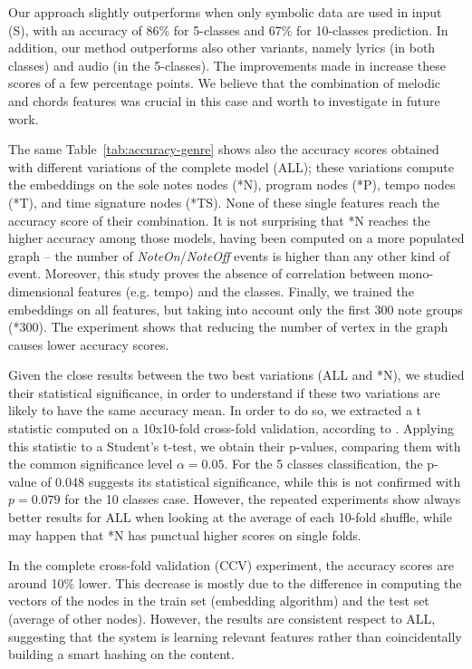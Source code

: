 \documentclass{article}
\newcommand{\tabref}[1]{\mbox{Table~\ref{#1}}}
\begin{document}
Our approach slightly outperforms \citep{mckay2010datasetslac} when only symbolic data are used in input (S), with an accuracy of 86\% for 5-classes and 67\% for 10-classes prediction. In addition, our method outperforms also other variants, namely lyrics (in both classes) and audio (in the 5-classes). The improvements made in \citep{mckay2018} increase these scores of a few percentage points. We believe that the combination of melodic and chords features was crucial in this case and worth to investigate in future work.

The same \tabref{tab:accuracy-genre} shows also the accuracy scores obtained with different variations of the complete model (ALL); these variations compute the embeddings on the sole notes nodes (*N), program nodes (*P), tempo nodes (*T), and time signature nodes (*TS). None of these single features reach the accuracy score of their combination. It is not surprising that *N reaches the higher accuracy among those models, having been computed on a more populated graph -- the number of  \textit{NoteOn}/\textit{NoteOff} events is higher than any other kind of event. Moreover, this study proves the absence of correlation between mono-dimensional features (e.g. tempo) and the classes.
Finally, we trained the embeddings on all features, but taking into account only the first 300 note groups (*300). The experiment shows that reducing the number of vertex in the graph causes lower accuracy scores.

Given the close results between the two best variations (ALL and *N), we studied their statistical significance, in order to understand if these two variations are likely to have the same accuracy mean. In order to do so, we extracted a t statistic computed on a 10x10-fold cross-fold validation, according to \cite{bouckaert2004significance}. Applying this statistic to a Student's t-test, we obtain their p-values, comparing them with the common significance level $\alpha = 0.05$. For the 5 classes classification, the p-value of 0.048 suggests its statistical significance, while this is not confirmed with $p = 0.079$ for the 10 classes case. However, the repeated experiments show always better results for ALL when looking at the average of each 10-fold shuffle, while may happen that *N has punctual higher scores on single folds.

In the complete cross-fold validation (CCV) experiment, the accuracy scores are around 10\% lower. This decrease is mostly due to the difference in computing the vectors of the nodes in the train set (embedding algorithm) and the test set (average of other nodes). However, the results are consistent respect to \textsc{ALL}, suggesting that the system is learning relevant features rather than coincidentally building a smart hashing on the content.
\end{document}
